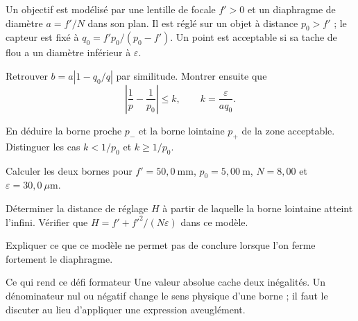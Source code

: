 \label{ex-D1}
Un objectif est modélisé par une lentille de focale $f'>0$ et un diaphragme de diamètre $a=f'/N$ dans son plan. Il est réglé sur un objet à distance $p_0>f'$ ; le capteur est fixé à $q_0=f'p_0/(p_0-f')$. Un point est acceptable si sa tache de flou a un diamètre inférieur à $\varepsilon$.
\begin{questions}
\item Retrouver $b=a|1-q_0/q|$ par similitude. Montrer ensuite que
\[\left|\frac1p-\frac1{p_0}\right|\leq k,\qquad k=\frac{\varepsilon}{a q_0}.\]
\item En déduire la borne proche $p_-$ et la borne lointaine $p_+$ de la zone acceptable. Distinguer les cas $k<1/p_0$ et $k\geq1/p_0$.
\item Calculer les deux bornes pour $f'=50{,}0\ \mathrm{mm}$, $p_0=5{,}00\ \mathrm{m}$, $N=8{,}00$ et $\varepsilon=30{,}0\ \mu\mathrm{m}$.
\item Déterminer la distance de réglage $H$ à partir de laquelle la borne lointaine atteint l'infini. Vérifier que $H=f'+f'^2/(N\varepsilon)$ dans ce modèle.
\item Expliquer ce que ce modèle ne permet pas de conclure lorsque l'on ferme fortement le diaphragme.
\end{questions}
\begin{methode}{Ce qui rend ce défi formateur}
Une valeur absolue cache deux inégalités. Un dénominateur nul ou négatif change le sens physique d'une borne ; il faut le discuter au lieu d'appliquer une expression aveuglément.
\end{methode}

